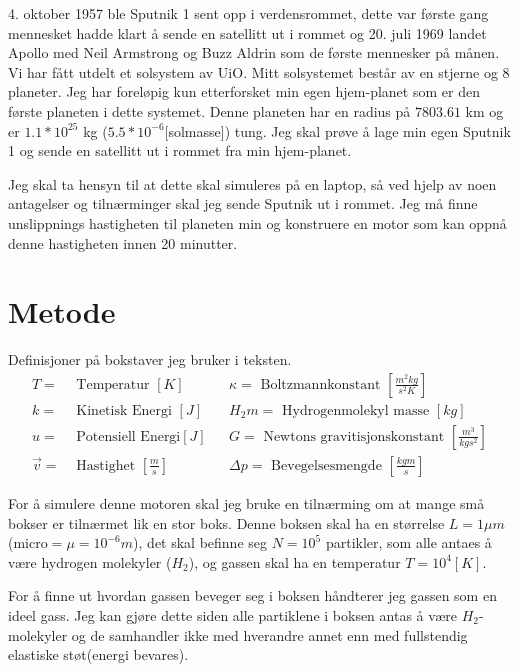 \documentclass[12pt,preprint]{aastex6}
\begin{document}
4. oktober 1957 ble Sputnik 1 sent opp i verdensrommet, dette var første gang mennesket hadde klart å sende en satellitt ut i rommet og 20. juli 1969 landet Apollo med Neil Armstrong og Buzz Aldrin som de første mennesker på månen. \\

Vi har fått utdelt et solsystem av UiO. Mitt solsystemet består av en stjerne og 8 planeter. Jeg har foreløpig kun etterforsket min egen hjem-planet som er den første planeten i dette systemet. Denne planeten har en radius på $7803.61$ km og er $1.1*10^{25}$ kg ($5.5*10^{-6}$[solmasse]) tung. Jeg skal prøve å lage min egen Sputnik 1 og sende en satellitt ut i rommet fra min hjem-planet.   

Jeg skal ta hensyn til at dette skal simuleres på en laptop, så ved hjelp av noen antagelser og tilnærminger skal jeg sende Sputnik ut i rommet. Jeg må finne unslippnings hastigheten til planeten min og konstruere en motor som kan oppnå denne hastigheten innen 20 minutter.

\section{Metode}
Definisjoner på bokstaver jeg bruker i teksten.
\begin{align*}
T = & \text{ Temperatur }[K] && \kappa = \text{ Boltzmannkonstant } \left[\frac{m^2kg}{s^2K}\right] \\
k = &\text{ Kinetisk Energi }[J] && H_2m = \text{ Hydrogenmolekyl masse } [kg] \\
u = &\text{ Potensiell Energi}[J] && G = \text{ Newtons gravitisjonskonstant } \left[\frac{m^3}{kgs^2}\right] \\
\vec{v} = & \text{ Hastighet } \left[\frac{m}{s}\right] && \Delta p = \text{ Bevegelsesmengde } \left[\frac{kg m}{s}\right]
\end{align*}

For å simulere denne motoren skal jeg bruke en tilnærming om at mange små bokser er tilnærmet lik en stor boks. Denne boksen skal ha en størrelse $L = 1\mu m$ (micro$=\mu=10^{-6} m$), det skal befinne seg $N = 10^5$ partikler, som alle antaes å være hydrogen molekyler ($H_2$), og gassen skal ha en temperatur $T = 10^4 [K]$.

For å finne ut hvordan gassen beveger seg i boksen håndterer jeg gassen som en ideel gass. Jeg kan gjøre dette siden alle partiklene i boksen antas å være $H_2$-molekyler og de samhandler ikke med hverandre annet enn med fullstendig elastiske støt(energi bevares). 
\end{document}

